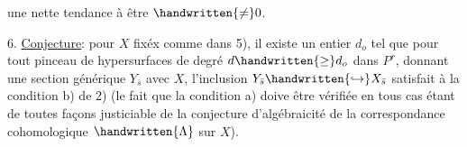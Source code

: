 
une nette tendance à être $\handwritten{\ne}0$.

6.\quad {} \uline{Conjecture}: pour $X$ fixéx comme dans 5),  il existe un entier $d_o$ tel que pour tout pinceau  de hypersurfaces de degré $d\handwritten{\geq}d_o$ dans $P^r$, donnant une section générique $Y_{\bar s}$ avec $X$, l'inclusion $Y_{\bar s}\handwritten{\hookrightarrow}X_{\bar s}$ satisfait à la condition b) de 2) (le fait que la condition a) doive être vérifiée en tous cas étant de toutes façons justiciable de la conjecture d'algébraicité de la correspondance cohomologique $\handwritten{\Lambda}$ sur $X$).

